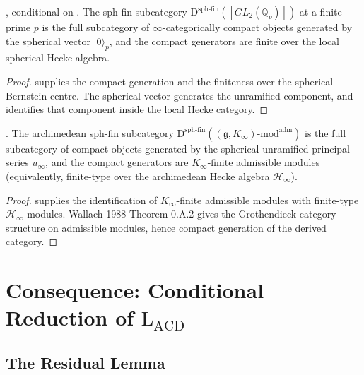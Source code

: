 \begin{proposition}
\label{v4-arith:lacd:prop:uniformity-finite}
\ClaimStatusProvedHereConditional, conditional on
. The sph-fin subcategory
\(\mathrm{D}^{\mathrm{sph\text{-}fin}}([GL_{2}(\mathbb{Q}_{p})])\) at a
finite prime \(p\) is the full subcategory of \(\infty\)-categorically
compact objects generated by the spherical vector
\(|0\rangle_{p}\), and the compact generators are finite over the
local spherical Hecke algebra.
\end{proposition}

\begin{proof}
 supplies the compact
generation and the finiteness over the spherical Bernstein centre. The
spherical vector generates the unramified component, and
 identifies that component inside
the local Hecke category.
\end{proof}

\begin{proposition}
\label{v4-arith:lacd:prop:uniformity-infinity}
\ClaimStatusProvedHere. The archimedean sph-fin subcategory
\(\mathrm{D}^{\mathrm{sph\text{-}fin}}((\mathfrak{g}, K_{\infty})\text{-mod}^{\mathrm{adm}})\)
is the full subcategory of compact objects generated by the
spherical unramified principal series \(u_{\infty}\), and the compact
generators are \(K_{\infty}\)-finite admissible modules (equivalently,
finite-type over the archimedean Hecke algebra \(\mathcal{H}_{\infty}\)).
\end{proposition}

\begin{proof}
 supplies the
identification of \(K_{\infty}\)-finite admissible modules with
finite-type \(\mathcal{H}_{\infty}\)-modules. Wallach 1988 Theorem
0.A.2 gives the Grothendieck-category structure on admissible
modules, hence compact generation of the derived category.
\end{proof}

\section{Consequence: Conditional Reduction of \(\mathrm{L}_{\mathrm{ACD}}\)}
\label{v4-arith:lacd:consequence}

\subsection{The Residual Lemma}

